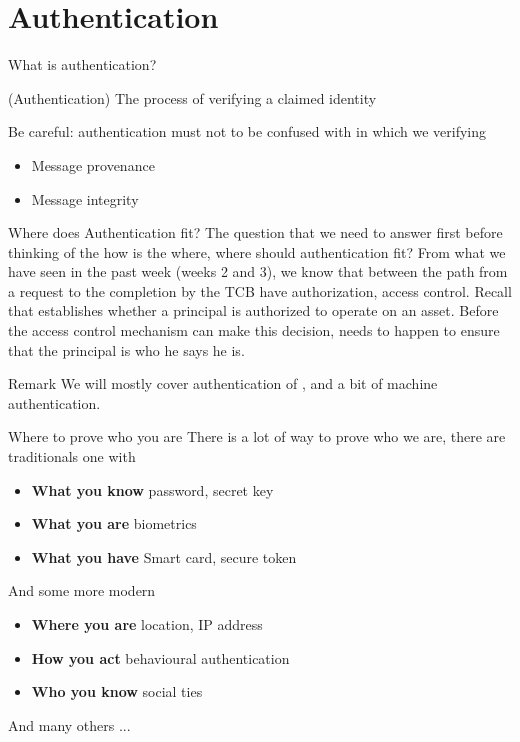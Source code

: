 \section{Authentication}
\begin{parag}{What is authentication?}
	\begin{definition}{(Authentication)}
    The process of verifying a claimed identity
    \end{definition}
	
\end{parag}
\begin{framedremark}
	Be careful: authentication must not to be confused with  in which we verifying 
	\begin{itemize}
	    \item Message provenance
	    \item Message integrity
	\end{itemize}
\end{framedremark}

\begin{parag}{Where does Authentication fit?}
	The question that we need to answer first before thinking of the how is the where, where should authentication fit? From what we have seen in the past week (weeks 2 and 3), we know that between the path from a request to the completion by the TCB  have authorization, access control. Recall that  establishes whether a principal is authorized to operate on an asset. Before the access control mechanism can make this decision,  needs to happen to ensure that the principal is who he says he is.
	\begin{subparag}{Remark}
	    We will mostly cover authentication of , and a bit of machine authentication.
	\end{subparag}
\end{parag}


\begin{parag}{Where to prove who you are}
    There is a lot of way to prove who we are, there are traditionals one with 
	\begin{itemize}
	    \item \textbf{What you know} password, secret key
	    \item \textbf{What you are} biometrics
	    \item \textbf{What you have} Smart card, secure token
	\end{itemize}
	And some more modern 
	\begin{itemize}
	    \item \textbf{Where you are} location, IP address
	    \item \textbf{How you act} behavioural authentication
	    \item \textbf{Who you know} social ties
	\end{itemize}
	And many others ...
\end{parag}

